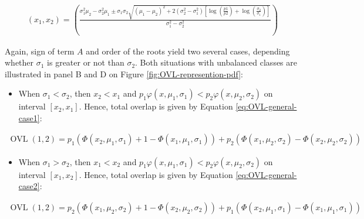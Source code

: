 \begin{equation}
\begin{split}
(x_1, x_2) = \left(\frac{\sigma_1^2 \mu_2 - \sigma_2^2 \mu_1 \pm \sigma_1 \sigma_2 \sqrt{(\mu_1 - \mu_2)^2 + 2(\sigma_2^2 - \sigma_1^2)\left[ \log (\frac{p1}{p2}) + \log (\frac{\sigma_2}{\sigma_1})\right]}}{\sigma_1^2 - \sigma_2^2}\right)
\end{split}
\label{eq:roots}
\end{equation}

Again, sign of term \(A\) and order of the roots yield two several cases,
depending whether \(\sigma_1\) is greater or not than \(\sigma_2\). Both
situations with unbalanced classes are illustrated in panel B and D on
Figure
\ref{fig:OVL-represention-pdf}:

\begin{itemize}
\tightlist
\item
  When \(\sigma_1 < \sigma_2\), then \(x_2 < x_1\) and
  \(p_1 \varphi(x, \mu_1, \sigma_1) < p_2 \varphi(x, \mu_2, \sigma_2)\)
  on interval \([x_2, x_1]\). Hence, total overlap is given by Equation
  \eqref{eq:OVL-general-case1}:
\end{itemize}

\begin{equation}
\begin{split}
\operatorname{OVL} (1, 2) = p_1 \left(\Phi(x_2, \mu_1, \sigma_1) +1 - \Phi(x_1, \mu_1, \sigma_1) \right) + p_2 \left( \Phi(x_1, \mu_2, \sigma_2) -\Phi(x_2, \mu_2, \sigma_2) \right)
\end{split}
\label{eq:OVL-general-case1}
\end{equation}

\begin{itemize}
\tightlist
\item
  When \(\sigma_1 > \sigma_2\), then \(x_1 < x_2\) and
  \(p_1 \varphi(x, \mu_1, \sigma_1) < p_2 \varphi(x, \mu_2, \sigma_2)\)
  on interval \([x_1, x_2]\). Hence, total overlap is given by Equation
  \eqref{eq:OVL-general-case2}:
\end{itemize}

\begin{equation}
\begin{split}
\operatorname{OVL} (1, 2) = p_2 \left(\Phi(x_1, \mu_2, \sigma_2) +1 - \Phi(x_2, \mu_2, \sigma_2) \right) + p_1 \left( \Phi(x_2, \mu_1, \sigma_1) -\Phi(x_1, \mu_1, \sigma_1) \right)
\end{split}
\label{eq:OVL-general-case2}
\end{equation}

